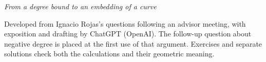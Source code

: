 \documentclass[12pt]{memoir}
\author{Ignacio Rojas\\[0.4ex]ChatGPT (OpenAI)}
\begin{document}
\maketitle
\begin{center}
\emph{From a degree bound to an embedding of a curve}
\par\bigskip
\begin{minipage}{0.8\textwidth}
\small\centering
Developed from Ignacio Rojas's questions following an advisor meeting,
with exposition and drafting by ChatGPT (OpenAI).
The follow-up question about negative degree is placed at the first
use of that argument. Exercises and separate solutions check both
the calculations and their geometric meaning.
\end{minipage}
\end{center}
\clearpage
\tableofcontents*
\clearpage
\end{document}
